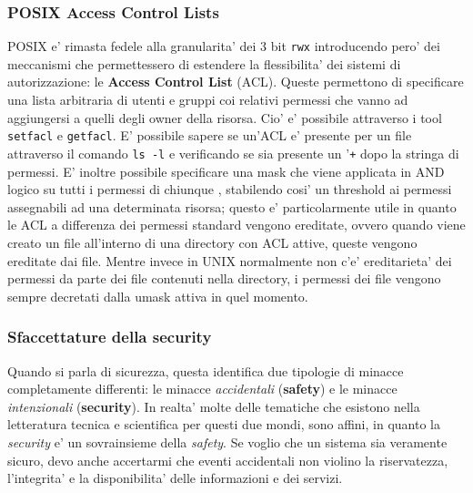 \subsubsection{POSIX Access Control Lists}
POSIX e' rimasta fedele alla granularita' dei 3 bit \texttt{rwx} introducendo pero' dei meccanismi che permettessero di estendere la flessibilita' dei sistemi di autorizzazione: le \textbf{Access Control List} (ACL). Queste permettono di specificare una lista arbitraria di utenti e gruppi coi relativi permessi che vanno ad aggiungersi a quelli degli owner della risorsa. Cio' e' possibile attraverso i tool \texttt{setfacl} e \texttt{getfacl}. E' possibile sapere se un'ACL e' presente per un file attraverso il comando \texttt{ls -l} e verificando se sia presente un '\texttt{+} dopo la stringa di permessi. E' inoltre possibile specificare una mask che viene applicata in AND logico su tutti i permessi di chiunque , stabilendo cosi' un threshold ai permessi assegnabili ad una determinata risorsa; questo e' particolarmente utile in quanto le ACL a differenza dei permessi standard vengono ereditate, ovvero quando viene creato un file all'interno di una directory con ACL attive, queste vengono ereditate dai file. Mentre invece in UNIX normalmente non c'e' ereditarieta' dei permessi da parte dei file contenuti nella directory, i permessi dei file vengono sempre decretati dalla umask attiva in quel momento.

\subsubsection{Sfaccettature della security}
Quando si parla di sicurezza, questa identifica due tipologie di minacce completamente differenti: le minacce \emph{accidentali} (\textbf{safety}) e le minacce \emph{intenzionali} (\textbf{security}). In realta' molte delle tematiche che esistono nella letteratura tecnica e scientifica per questi due mondi, sono affini, in quanto la \emph{security} e' un sovrainsieme della \emph{safety}. Se voglio che un sistema sia veramente sicuro, devo anche accertarmi che eventi accidentali non violino la riservatezza, l'integrita' e la disponibilita' delle informazioni e dei servizi.





